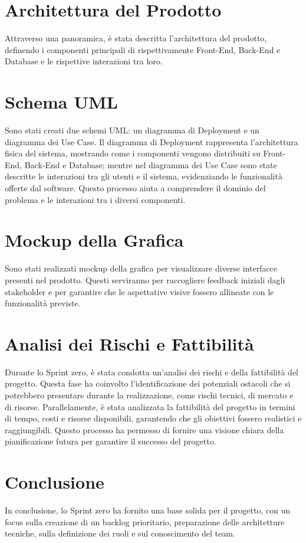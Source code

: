 \documentclass{article}
\begin{document}
\section{Architettura del Prodotto}
Attraverso una panoramica, è stata descritta l’architettura del prodotto, definendo i componenti principali di rispettivamente Front-End, Back-End e Database e le rispettive interazioni tra loro.

\section{Schema UML}
Sono stati creati due schemi UML: un diagramma di Deployment e un diagramma dei Use Case. Il diagramma di Deployment rappresenta l’architettura fisica del sistema, mostrando come i componenti vengono distribuiti su Front-End, Back-End e Database; mentre nel diagramma dei Use Case sono state descritte le interazioni tra gli utenti e il sistema, evidenziando le funzionalità offerte dal software. Questo processo aiuta a comprendere il dominio del problema e le interazioni tra i diversi componenti.

\section{Mockup della Grafica}
Sono stati realizzati mockup della grafica per visualizzare diverse interfacce presenti nel prodotto. Questi serviranno per raccogliere feedback iniziali dagli stakeholder e per garantire che le aspettative visive fossero allineate con le funzionalità previste.

\section{Analisi dei Rischi e Fattibilità}
Durante lo Sprint zero, è stata condotta un'analisi dei rischi e della fattibilità del progetto. Questa fase ha coinvolto l'identificazione dei potenziali ostacoli che si potrebbero presentare durante la realizzazione, come rischi tecnici, di mercato e di risorse. Parallelamente, è stata analizzata la fattibilità del progetto in termini di tempo, costi e risorse disponibili, garantendo che gli obiettivi fossero realistici e raggiungibili. Questo processo ha permesso di fornire una visione chiara della pianificazione futura per garantire il successo del progetto.


\section{Conclusione}
In conclusione, lo Sprint zero ha fornito una base solida per il progetto, con un focus sulla creazione di un backlog prioritario, preparazione delle architetture tecniche, sulla definizione dei ruoli e sul conoscimento del team.
\end{document}
